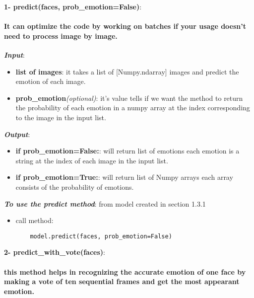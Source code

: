

\newpage
\noindent\textbf{1- predict(faces, prob\_emotion=False)}:
\paragraph{It can optimize the code by working on batches if your usage doesn't need to process image by image.\newline}
\bigbreak
\noindent\textbf{\textit{Input}}:
\begin{itemize}
	\item \textbf{list of images}:\newline
	it takes a list of [Numpy.ndarray] images and predict the emotion of each image.
	\item \textbf{prob\_emotion}\textit{(optional)}:\newline
	it's value tells if we want the method to return the probability of each emotion in a numpy array at the index corresponding to the image in the input list. 
\end{itemize}
\noindent\textbf{\textit{Output}}:
\begin{itemize}
	\item \textbf{if prob\_emotion=False:}:\newline
	will return list of emotions each emotion is a string at the index of each image in the input list.
	\item \textbf{if prob\_emotion=True:}:\newline
	will return list of Numpy arrays each array consists of the probability of emotions.
\end{itemize}

\textbf{\textit{To use the predict method}}:
\bigbreak
from model created in section 1.3.1

\begin{itemize}
	\item call method:
	\begin{verbatim}
	model.predict(faces, prob_emotion=False)
	\end{verbatim}
\end{itemize}


\noindent\textbf{2- predict\_with\_vote(faces)}:
\paragraph{this method helps in recognizing the accurate emotion of one face by making a vote of ten sequential frames and get the most appearant emotion. \newline}


